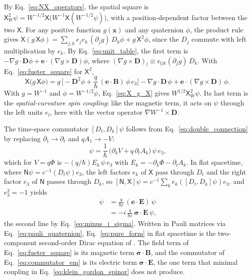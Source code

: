 \documentclass[aps,prd,onecolumn,tightenlines,nofootinbib,notitlepage,11pt,floatfix]{revtex4-2}
\theoremstyle{indentedtheorem}
\begin{document}
By Eq.~\eqref{eq:NX_operators}, the spatial square is $\mathsf{X}_W^2\psi = W^{-1/2}\mathsf{X}\big(W^{-1}\mathsf{X}(W^{-1/2}\psi)\big)$, with a position-dependent factor between the two $\mathsf{X}$. For any positive function $g(\mathbf{x})$ and any quaternion $\phi$, the product rule gives $\mathsf{X}(g\,\mathsf{X}\phi) = \sum_{j,k}e_je_k\,(\partial_jg)\,D_k\phi + g\,\mathsf{X}^2\phi$, since the $D_j$ commute with left multiplication by $e_k$. By Eq.~\eqref{eq:unit_table}, the first term is $-\nabla g\cdot\mathbf{D}\phi + \mathbf{e}\cdot(\nabla g\times\mathbf{D})\phi$, where $(\nabla g\times\mathbf{D})_l \equiv \epsilon_{ljk}(\partial_jg)\,D_k$. With Eq.~\eqref{eq:fueter_square} for $\mathsf{X}^2$,
\begin{equation}
    \mathsf{X}\big(g\,\mathsf{X}\phi\big) = g\,\Big[-\mathbf{D}^2\phi + \frac{q}{\hbar}\,(\mathbf{e}\cdot\mathbf{B})\,\phi\,e_3\Big] - \nabla g\cdot\mathbf{D}\,\phi + \mathbf{e}\cdot(\nabla g\times\mathbf{D})\,\phi .
    \label{eq:X_g_X}
\end{equation}
With $g=W^{-1}$ and $\phi=W^{-1/2}\psi$, Eq.~\eqref{eq:X_g_X} gives $W^{1/2}\mathsf{X}_W^2\psi$. Its last term is the \emph{spatial-curvature spin coupling}: like the magnetic term, it acts on $\psi$ through the left units $e_l$, here with the vector operator $\nabla W^{-1}\times\mathbf{D}$.

The time-space commutator $[D_t,D_k]\psi$ follows from Eq.~\eqref{eq:double_connection} by replacing $\partial_1\to\partial_t$ and $qA_1\to-V$:
\begin{equation}
    [D_t,D_k]\,\psi = \frac{1}{\hbar}\,\big(\partial_k V + q\,\partial_t A_k\big)\,\psi\,e_3 ,
    \label{eq:time_space_curvature}
\end{equation}
which for $V=q\Phi$ is $-(q/\hbar)E_k\,\psi\,e_3$ with $E_k = -\partial_k\Phi - \partial_t A_k$. In flat spacetime, where $\mathsf{N}\psi = c^{-1}(D_t\psi)e_3$, the left factors $e_k$ of $\mathsf{X}$ pass through $D_t$ and the right factor $e_3$ of $\mathsf{N}$ passes through $D_k$, so $[\mathsf{N},\mathsf{X}]\psi = c^{-1}\sum_k e_k([D_t,D_k]\psi)e_3$, and $e_3^2=-1$ yields
\begin{align}
    [\mathsf{N},\mathsf{X}]\,\psi &= \frac{q}{\hbar c}\,(\mathbf{e}\cdot\mathbf{E})\,\psi \nonumber \\
    &= -i\,\frac{q}{\hbar c}\,\boldsymbol{\sigma}\cdot\mathbf{E}\,\psi ,
    \label{eq:commutator_em}
\end{align}
the second line by Eq.~\eqref{eq:minus_i_sigma}. Written in Pauli matrices via Eq.~\eqref{eq:pauli_quaternion}, Eq.~\eqref{eq:pure_form} in flat spacetime is the two-component second-order Dirac equation of \citet{FeynmanGellMann1958Theory}. The field term of Eq.~\eqref{eq:fueter_square} is its magnetic term $\boldsymbol{\sigma}\cdot\mathbf{B}$, and the commutator of Eq.~\eqref{eq:commutator_em} is its electric term $\boldsymbol{\sigma}\cdot\mathbf{E}$, the one term that minimal coupling in Eq.~\eqref{eq:klein_gordon_spinor} does not produce.
\end{document}
